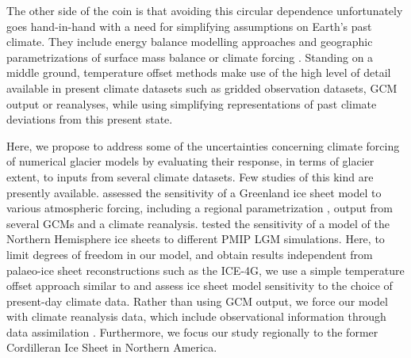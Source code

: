 The other side of the coin is that avoiding this circular dependence unfortunately goes hand-in-hand with a need for simplifying assumptions on Earth's past climate. They include energy balance modelling approaches \citep{tarasov-peltier-1997} and geographic parametrizations of surface mass balance \citep{robert-1991} or climate forcing \citep{johnson-fastook-2002}. Standing on a middle ground, temperature offset methods \citep{greve-etal-1999,bintanja-etal-2005} make use of the high level of detail available in present climate datasets such as gridded observation datasets, GCM output or reanalyses, while using simplifying representations of past climate deviations from this present state.

Here, we propose to address some of the uncertainties concerning climate forcing of numerical glacier models by evaluating their response, in terms of glacier extent, to inputs from several climate datasets. Few studies of this kind are presently available. \citet{quiquet-etal-2012} assessed the sensitivity of a Greenland ice sheet model to various atmospheric forcing, including a regional parametrization \citep{fausto-etal-2009}, output from several GCMs and a climate reanalysis. \citet{rodgers-etal-2004,charbit-etal-2007} tested the sensitivity of a model of the Northern Hemisphere ice sheets to different PMIP LGM simulations. Here, to limit degrees of freedom in our model, and obtain results independent from palaeo-ice sheet reconstructions such as the ICE-4G, we use a simple temperature offset approach similar to \citep{greve-etal-1999,bintanja-etal-2005} and assess ice sheet model sensitivity to the choice of present-day climate data. Rather than using GCM output, we force our model with climate reanalysis data, which include observational information through data assimilation \citep{bengtsson-etal-2007}. Furthermore, we focus our study regionally to the former Cordilleran Ice Sheet in Northern America.

